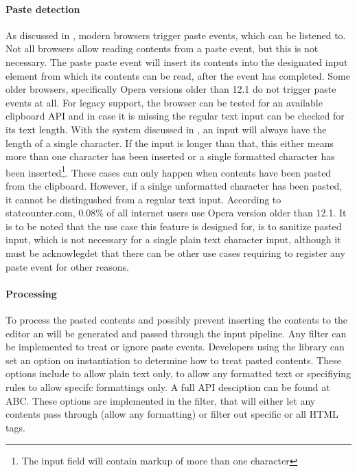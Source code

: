 \paragraph{Paste detection} As discussed in , modern browsers trigger paste events, which can be listened to. Not all browsers allow reading contents from a paste event, but this is not necessary. The paste paste event will insert its contents into the designated input element from which its contents can be read, after the event has completed. Some older browsers, specifically Opera versions older than 12.1 do not trigger paste events at all. For legacy support, the browser can be tested for an available clipboard API and in case it is missing the regular text input can be checked for its text length. With the system discussed in , an input will always have the length of a single character. If the input is longer than that, this either means more than one character has been inserted or a single formatted character has been inserted\footnote{The input field will contain markup of more than one character}. These cases can only happen when contents have been pasted from the clipboard. However, if a sinlge unformatted character has been pasted, it cannot be distingushed from a regular text input. According to statcounter.com, 0.08\% of all internet users use Opera version older than 12.1. It is to be noted that the use case this feature is designed for, is to sanitize pasted input, which is not necessary for a single plain text character input, although it must be acknowlegdet that there can be other use cases requiring to register any paste event for other reasons.

\paragraph{Processing} To process the pasted contents and possibly prevent inserting the contents to the editor an  will be generated and passed through the input pipeline. Any filter can be implemented to treat or ignore paste events. Developers using the library can set an option on instantiation to determine how to treat pasted contents. These options include to allow plain text only, to allow any formatted text or specifiying rules to allow specifc formattings only. A full API desciption can be found at ABC. These options are implemented in the  filter, that will either let any contents pass through (allow any formatting) or filter out specific or all HTML tags.

